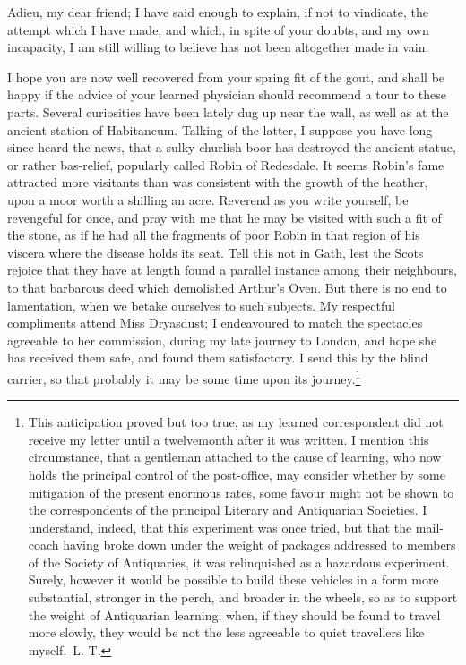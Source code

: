 Adieu, my dear friend; I have said enough to explain, if not to
vindicate, the attempt which I have made, and which, in spite of your
doubts, and my own incapacity, I am still willing to believe has not
been altogether made in vain.

I hope you are now well recovered from your spring fit of the gout, and
shall be happy if the advice of your learned physician should recommend
a tour to these parts. Several curiosities have been lately dug up near
the wall, as well as at the ancient station of Habitancum. Talking of
the latter, I suppose you have long since heard the news, that a sulky
churlish boor has destroyed the ancient statue, or rather bas-relief,
popularly called Robin of Redesdale. It seems Robin's fame attracted
more visitants than was consistent with the growth of the heather, upon
a moor worth a shilling an acre. Reverend as you write yourself, be
revengeful for once, and pray with me that he may be visited with such a
fit of the stone, as if he had all the fragments of poor Robin in that
region of his viscera where the disease holds its seat. Tell this not in
Gath, lest the Scots rejoice that they have at length found a parallel
instance among their neighbours, to that barbarous deed which demolished
Arthur's Oven. But there is no end to lamentation, when we betake
ourselves to such subjects. My respectful compliments attend Miss
Dryasdust; I endeavoured to match the spectacles agreeable to her
commission, during my late journey to London, and hope she has received
them safe, and found them satisfactory. I send this by the blind
carrier, so that probably it may be some time upon its
journey.\footnote{This anticipation proved but too true, as my learned
correspondent did not receive my letter until a twelvemonth after it was
written. I mention this circumstance, that a gentleman attached to the
cause of learning, who now holds the principal control of the
post-office, may consider whether by some mitigation of the present
enormous rates, some favour might not be shown to the correspondents of
the principal Literary and Antiquarian Societies. I understand, indeed,
that this experiment was once tried, but that the mail-coach having
broke down under the weight of packages addressed to members of the
Society of Antiquaries, it was relinquished as a hazardous experiment.
Surely, however it would be possible to build these vehicles in a form
more substantial, stronger in the perch, and broader in the wheels, so
as to support the weight of Antiquarian learning; when, if they should
be found to travel more slowly, they would be not the less agreeable to
quiet travellers like myself.--L. T.}

